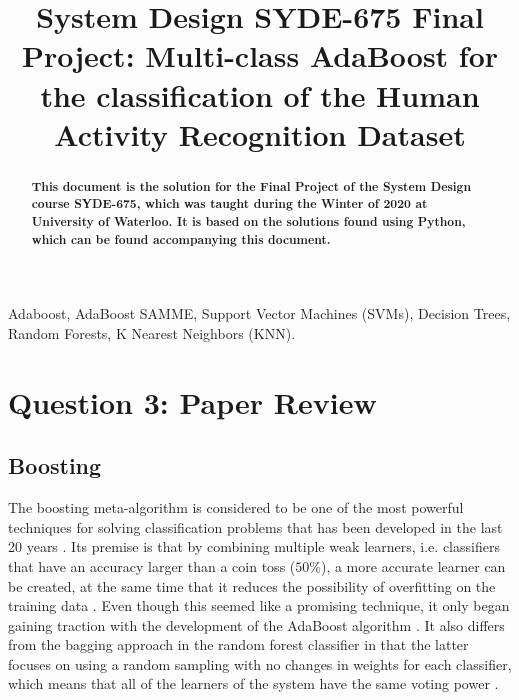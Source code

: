 \documentclass{article}
\title{System Design SYDE-675 Final Project: Multi-class AdaBoost for the classification of the Human Activity Recognition Dataset}
\begin{document}
%
\maketitle

\begin{abstract}
\ninept
\textbf{
This document is the solution for the Final Project of the System Design course SYDE-675, which was taught during the Winter of 2020 at University of Waterloo. It is based on the solutions found using Python, which can be found accompanying this document.
} 
\end{abstract}
%
\begin{keywords}
\ninept
Adaboost, AdaBoost SAMME, Support Vector Machines (SVMs), Decision Trees, Random Forests, K Nearest Neighbors (KNN).
\end{keywords} 

\section{Question 3: Paper Review}
\label{sec:Q3}
\subsection{Boosting}
The boosting meta-algorithm is considered to be one of the most powerful techniques for solving classification problems that has been developed in the last 20 years \cite{statisticalLearning}. Its premise is that by combining multiple weak learners, i.e. classifiers that have an accuracy larger than a coin toss ($50\%$), a more accurate learner can be created, at the same time that it reduces the possibility of overfitting on the training data \cite{Schapire_boosting}. Even though this seemed like a promising technique, it only began gaining traction with the development of the AdaBoost algorithm \cite{statisticalLearning}. It also differs from the bagging approach in the random forest classifier in that the latter focuses on using a random sampling with no changes in weights for each classifier, which means that all of the learners of the system have the same voting power \cite{Breinan_random_forests}.
\end{document}
